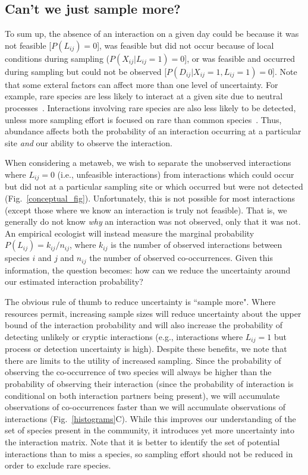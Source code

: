 \documentclass[12pt]{article}
\begin{document}
\begin{spacing}{2.0}
    \subsection*{Can't we just sample more?}

        To sum up, the absence of an interaction on a given day could  be because it was not feasible [$P(L_{ij}) = 0$], was feasible but did not occur because of local conditions during sampling ($P(X_{ij}|L_{ij} = 1) = 0$], or was feasible and occurred during sampling but could not be observed [$P(D_{ij}|X_{ij} = 1,L_{ij} = 1) = 0$]. Note that some exteral factors can affect more than one level of uncertainty. For example, rare species are less likely to interact at a given site due to neutral processes~\citep{Jordano2016,Graham2018}. Interactions involving rare species are also less likely to be detected, unless more sampling effort is focused on rare than common species~\citep{Bartomeus2013,Jordano2016}. Thus, abundance affects both the probability of an interaction occurring at a particular site \emph{and} our ability to observe the interaction. 


        When considering a metaweb, we wish to separate the unobserved interactions where $L_{ij} = 0$ (i.e., unfeasible interactions) from interactions which could occur but did not at a particular sampling site or which occurred but were not detected (Fig.~\ref{conceptual_fig}). Unfortunately, this is not possible for most interactions (except those where we know an interaction is truly not feasible). That is, we generally do not know \emph{why} an interaction was not observed, only that it was not. An empirical ecologist will instead measure the marginal probability $P(L_{ij}) = k_{ij}/n_{ij}$, where $k_{ij}$ is the number of observed interactions between species $i$ and $j$ and $n_{ij}$ the number of observed co-occurrences. Given this information, the question becomes: how can we reduce the uncertainty around our estimated interaction probability?


        The obvious rule of thumb to reduce uncertainty is ``sample more". Where resources permit, increasing sample sizes will reduce uncertainty about the upper bound of the interaction probability and will also increase the probability of detecting unlikely or cryptic interactions (e.g., interactions where $L_{ij} = 1$ but process or detection uncertainty is high). Despite these benefits, we note that there are limits to the utility of increased sampling. Since the probability of observing the co-occurrence of two species will always be higher than the probability of observing their interaction (since the probability of interaction is conditional on both interaction partners being present), we will accumulate observations of co-occurrences faster than we will accumulate observations of interactions (Fig.~\ref{histograms}C). While this improves our understanding of the set of species present in the community, it introduces yet more uncertainty into the interaction matrix. Note that it is better to identify the set of potential interactions than to miss a species, so sampling effort should not be reduced in order to exclude rare species.



\end{spacing}
\end{document}

